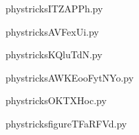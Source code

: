     

    \clearpage
    


    \newcommand{\CaptionFigITZAPPh}{<+Type your caption here+>}
    \begin{center}
        
    \end{center}
    phystricksITZAPPh.py

    

    \clearpage
    


    \newcommand{\CaptionFigAVFexUi}{<+Type your caption here+>}
    \begin{center}
        
    \end{center}
    phystricksAVFexUi.py

    

    \clearpage
    


    \newcommand{\CaptionFigKQluTdN}{<+Type your caption here+>}
    \begin{center}
        
    \end{center}
    phystricksKQluTdN.py

    

    \clearpage
    


    \newcommand{\CaptionFigAWKEooFytNYo}{<+Type your caption here+>}
    \begin{center}
        
    \end{center}
    phystricksAWKEooFytNYo.py

    

    \clearpage
    


    \newcommand{\CaptionFigOKTXHoc}{<+Type your caption here+>}
    \begin{center}
        
    \end{center}
    phystricksOKTXHoc.py

    

    \clearpage
    


    \newcommand{\CaptionFigfigureTFaRFVd}{<+Type your caption here+>}
    \begin{center}
        
    \end{center}
    phystricksfigureTFaRFVd.py

